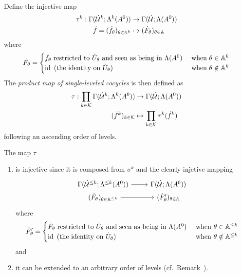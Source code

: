 \begin{defn}\label{defn:theMapTau}
  Define the injective map
  \begin{align*}
    \tau^k:\Gamma(\dot{\mathcal{U}}^k;\Lambda^k(A^0)) &\to \Gamma(\dot{\mathcal{U}};\Lambda(A^0))
  \\\dot f=(\dot f_\theta)_{\theta\in\mathbb{A}^k} &\mapsto
    (\dot F_\theta)_{\theta\in\mathbb{A}}
  \end{align*}
  where
  \[
    \dot F_\theta=\begin{cases}
      \dot f_\theta \text{~restricted to } \dot U_\theta
      \text{~and seen as being in } \Lambda(A^0)
      & \text{~when } \theta\in\mathbb{A}^k
    \\\operatorname{id} \text{~(the identity on $\dot U_\theta$) }
      & \text{~when } \theta\notin\mathbb{A}^k
    \end{cases}
  \]
  The \emph{product map of single-leveled cocycles} is then defined as
  \begin{align*}
    \tau:\prod_{k\in\mathcal{K}}\Gamma(\dot {\mathcal{U}}^k;\Lambda^k(A^0))
    &\to
    \Gamma(\dot{\mathcal{U}};\Lambda(A^0))
  \\(\dot f^k)_{k\in\mathcal{K}}
    &\mapsto
    \prod_{k\in\mathcal{K}}\tau^k(\dot f^k)
  \end{align*}
  following an ascending order of levels.
  \begin{s-rem}
    The map $\tau$
    \begin{enumerate}
      \item is injective since it is composed from $\sigma^k$ and the clearly
        injetive mapping
        \[ \begin{tikzcd}[row sep=0cm]
            \Gamma(\dot\cU^{\leq k};\Lambda^{\leq k}(A^0))
            \rar
            & \Gamma(\dot\cU;\Lambda(A^0))
          \\(\dot F_\theta)_{\theta\in\A^{\leq k}}
            \rar[maps to] 
            & (\dot F'_\theta)_{\theta\in\A}
        \end{tikzcd} \]
        where 
        \[
          \dot F'_\theta=\begin{cases}
            \dot F_\theta \text{~restricted to } \dot U_\theta
            \text{~and seen as being in } \Lambda(A^0)
            & \text{~when } \theta\in\mathbb{A}^{\leq k}
            \\\operatorname{id} \text{~(the identity on $\dot U_\theta$) }
            & \text{~when } \theta\notin\mathbb{A}^{\leq k}
          \end{cases}
        \]
        and
      \item it can be extended to an arbitrary order of levels
        (cf.\ Remark~\cite[Rem.II.3.5]{Loday1994}).
    \end{enumerate}
  \end{s-rem}
\end{defn}
